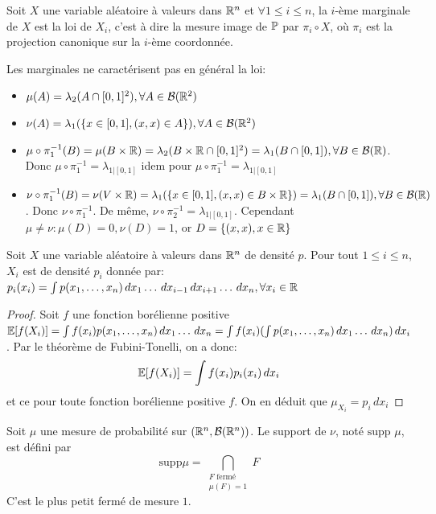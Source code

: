 \documentclass[]{report}
\begin{document}
    \begin{df}{}{}
        Soit $X$ une variable aléatoire à valeurs dans $\mathbb{R}^n$ et $\forall 1\le i\le n$, la $i$-ème marginale de $X$ est la loi de $X_i$, c'est à dire la mesure image de $\mathbb{P}$ par $\pi_i\circ X$, où $\pi_i$ est la projection canonique sur la $i$-ème coordonnée.
    \end{df}

    \begin{re}{}{}
        Les marginales ne caractérisent pas en général la loi:
        \begin{itemize}
            \item $\mu(A)=\lambda_2(A\cap[0,1]^2),\forall A\in \mathcal{B}(\mathbb{R}^2)$
            \item $\nu(A)=\lambda_1(\{x\in[0,1],(x,x)\in A\}),\forall A\in \mathcal{B}(\mathbb{R}^2)$
            \item $\mu\circ \pi_1^{-1}(B)=\mu(B\times\mathbb{R})=\lambda_2(B\times\mathbb{R}\cap[0,1]^2)=\lambda_1(B\cap[0,1]),\forall B\in \mathcal{B}(\mathbb{R})$. Donc $\mu\circ \pi_1^{-1}=\lambda_{1|[0,1]}$ idem pour $\mu\circ \pi_1^{-1}=\lambda_{1|[0,1]}$
            \item $\nu\circ \pi_1^{-1}(B)=\nu (V\times \mathbb{R})=\lambda_1(\{x\in[0,1],(x,x)\in B\times \mathbb{R}\})=\lambda_1(B\cap[0,1]),\forall B\in \mathcal{B}(\mathbb{R})$. Donc $\nu\circ \pi_1^{-1}$. De même, $\nu\circ\pi_2^{-1}=\lambda_{1|[0,1]}$. Cependant $\mu\neq\nu:\mu(D)=0,\nu(D)=1$, or $D=\{(x,x),x\in \mathbb{R}\}$
        \end{itemize}
    \end{re}

    \begin{prop}{}{}
        Soit $X$ une variable aléatoire à valeurs dans $\mathbb{R}^n$ de densité $p$. Pour tout $1\le i\le n$, $X_i$ est de densité $p_i$ donnée par: $p_i(x_i)=\int p(x_1,\ldots,x_n)\,dx_1\ldots\,dx_{i-1}\,dx_{i+1}\ldots \,dx_n,\forall x_i\in\mathbb{R}$
    \end{prop}

    \begin{proof}
        Soit $f$ une fonction borélienne positive $\mathbb{E}[f(X_i)]=\int f(x_i)p(x_1, \ldots,x_n)\,dx_1\ldots\,dx_n=\int f(x_i)(\int p(x_1,\ldots,x_n)\,dx_1\ldots\,dx_n)\,dx_i$. Par le théorème de Fubini-Tonelli, on a donc:
        \[\mathbb{E}[f(X_i)]=\int f(x_i)p_i(x_i)\,dx_i\]
        et ce pour toute fonction borélienne positive $f$. On en déduit que $\mu_{X_i}=p_i\,dx_i$
    \end{proof}

    \begin{df}{}{}
        Soit $\mu$ une mesure de probabilité sur $(\mathbb{R}^n,\mathcal{B}(\mathbb{R}^n))$. Le support de $\nu$, noté $\text{supp } \mu$, est défini par 
        \[\text{supp} \mu=\bigcap_{\substack{F\text{ fermé}\\ \mu(F)=1}}F\]
        C'est le plus petit fermé de mesure $1$. 
    \end{df}
\end{document}
